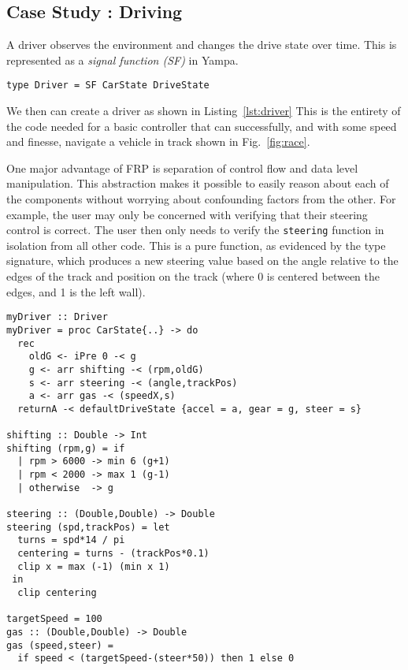 \subsection{Case Study : Driving}
A driver observes the environment and changes the drive state over time.
This is represented as a \textit{signal function (SF)} in Yampa.

\begin{lstlisting}
type Driver = SF CarState DriveState
\end{lstlisting}

We then can create a driver as shown in Listing~\ref{lst:driver}
This is the entirety of the code needed for a basic controller that can successfully, and with some speed and finesse, navigate a vehicle in track shown in Fig.~\ref{fig:race}.

One major advantage of FRP is separation of control flow and data level manipulation. 
This abstraction makes it possible to easily reason about each of the components without worrying about confounding factors from the other.
For example, the user may only be concerned with verifying that their steering control is correct.
The user then only needs to verify the \texttt{steering} function in isolation from all other code.
This is a pure function, as evidenced by the type signature, which produces a new steering value based on the angle relative to the edges of the track and position on the track (where 0 is centered between the edges, and 1 is the left wall).

\begin{lstlisting}[float,floatplacement=TR,caption=A complete basic controller in Yampa, label=lst:driver]
myDriver :: Driver
myDriver = proc CarState{..} -> do
  rec 
    oldG <- iPre 0 -< g
    g <- arr shifting -< (rpm,oldG)
    s <- arr steering -< (angle,trackPos)
    a <- arr gas -< (speedX,s)
  returnA -< defaultDriveState {accel = a, gear = g, steer = s}

shifting :: Double -> Int
shifting (rpm,g) = if 
  | rpm > 6000 -> min 6 (g+1)
  | rpm < 2000 -> max 1 (g-1)
  | otherwise  -> g
 
steering :: (Double,Double) -> Double
steering (spd,trackPos) = let
  turns = spd*14 / pi
  centering = turns - (trackPos*0.1)
  clip x = max (-1) (min x 1)
 in
  clip centering
  
targetSpeed = 100
gas :: (Double,Double) -> Double
gas (speed,steer) = 
  if speed < (targetSpeed-(steer*50)) then 1 else 0
\end{lstlisting}

